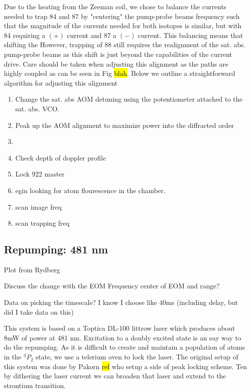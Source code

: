 Due to the heating from the Zeeman coil, we chose to balance the currents needed to trap 84 and 87 by "centering" the pump-probe beams frequency such that the magnitude of the currents needed for both isotopes is similar, but with 84 requiring a $(+)$ current and 87 a $(-)$ current.
This balancing means that shifting the 
However, trapping of 88 still requires the realignment of the sat. abs. pump-probe beams as this shift is just beyond the capabilities of the current drive. 
Care should be taken when adjusting this alignment as the paths are highly coupled as can be seen in Fig \hl{blah}. 
Below we outline a straightforward algorithm for adjusting this alignment
\begin{enumerate}[nolistsep]
\item Change the sat. abs AOM detuning using the potentiometer attached to the sat. abs. VCO. 
\item Peak up the AOM alignment to maximize power into the diffracted order
\item
\item Check depth of doppler profile
\item Lock 922 master
\item egin looking for atom flourescence in the chamber.
\item scan image freq
\item scan trapping freq
\end{enumerate}
		



\subsection{Repumping: 481 nm}
\label{ssec:481sys}

Plot from Rydberg

Discuss the change with the EOM
	Frequency center of EOM and range?
	
Data on picking the timescale?
	I know I choose like 40ms (including delay, but did I take data on this)

This system is based on a Toptica DL-100 littrow laser which produces about 8mW of power at 481 nm. 
Excitation to a doubly excited state is an eay way to do the repumping.
As it is difficult to create and maintain a population of atoms in the $^3P_2$ state, we use a telerium oven to lock the laser.
The original setup of this system was done by Pakorn \hl{ref} who setup a side of peak locking scheme. 
Ten by dithering the laser current we can broaden that laser and extend to the strontium transition.

